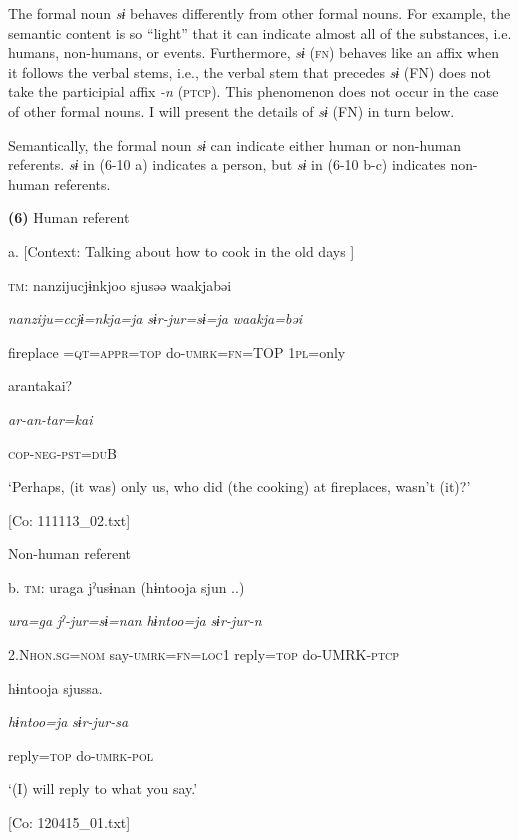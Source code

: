 The formal noun \textit{sɨ} behaves differently from other formal nouns. For example, the semantic content is so “light” that it can indicate almost all of the substances, i.e. humans, non-humans, or events. Furthermore, \textit{sɨ} (\textsc{fn}) behaves like an affix when it follows the verbal stems, i.e., the verbal stem that precedes \textit{sɨ} (FN) does not take the participial affix \textit{{}-n} (\textsc{ptcp}). This phenomenon does not occur in the case of other formal nouns. I will present the details of \textit{sɨ} (FN) in turn below.

Semantically, the formal noun \textit{sɨ} can indicate either human or non-human referents. \textit{sɨ} in (6-10 a) indicates a person, but \textit{sɨ} in (6-10 b-c) indicates non-human referents.

\textbf{(6)}  Human referent

  a.  [Context: Talking about how to cook in the old days ]

    \textsc{tm}:  nanzijucjɨnkjoo  sjusəə  waakjabəi

      \textit{nanziju=ccjɨ=nkja=ja}  \textit{sɨr-jur=sɨ=ja}  \textit{waakja=bəi}

      fireplace =\textsc{qt}=\textsc{appr}=\textsc{top}  do-\textsc{umrk}=\textsc{fn}=TOP  1\textsc{pl}=only

      arantakai?

      \textit{ar-an-tar=kai}

      \textsc{cop}-\textsc{neg}-\textsc{pst}=\textsc{du}B

      ‘Perhaps, (it was) only us, who did (the cooking) at fireplaces, wasn’t (it)?’

      [Co: 111113\_02.txt]

  Non-human referent

  b.  \textsc{tm}:  uraga  jˀusɨnan  (hɨntooja  sjun ..)

      \textit{ura=ga}  \textit{jˀ-jur=sɨ=nan}  \textit{hɨntoo=ja}  \textit{sɨr-jur-n}

      2.N\textsc{hon}.\textsc{sg}=\textsc{nom}  say-\textsc{umrk}=\textsc{fn}=\textsc{loc}1  reply=\textsc{top}  do-UMRK-\textsc{ptcp}

      hɨntooja  sjussa.

      \textit{hɨntoo=ja}  \textit{sɨr-jur-sa}

      reply=\textsc{top}  do-\textsc{umrk}-\textsc{pol}

      ‘(I) will reply to what you say.’

      [Co: 120415\_01.txt]

